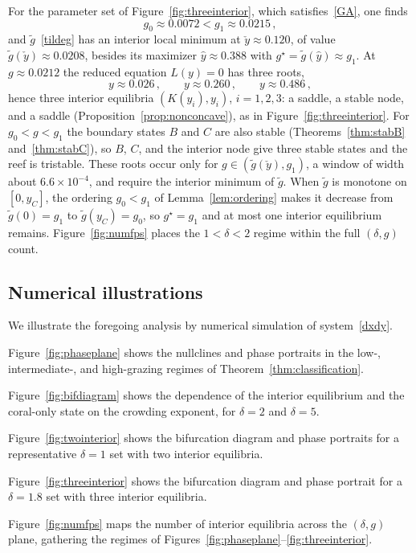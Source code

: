 \documentclass[reqno,11pt]{amsart}
\numberwithin{equation}{section}
\begin{document}
For the parameter set of Figure~\ref{fig:threeinterior}, which satisfies~\eqref{GA}, one finds
\[
g_0\approx0.0072<g_1\approx0.0215\,,
\]
and $\tilde g$~\eqref{tildeg} has an interior local minimum at $\check y\approx0.120$, of value $\tilde g(\check y)\approx0.0208$, besides its maximizer $\hat y\approx0.388$ with $g^\star=\tilde g(\hat y)\approx g_1$. At $g\approx0.0212$ the reduced equation $L(y)=0$ has three roots,
\[
y\approx0.026\,,\qquad y\approx0.260\,,\qquad y\approx0.486\,,
\]
hence three interior equilibria $(K(y_i),y_i)$, $i=1,2,3$: a saddle, a stable node, and a saddle (Proposition~\ref{prop:nonconcave}), as in Figure~\ref{fig:threeinterior}. For $g_0<g<g_1$ the boundary states $B$ and $C$ are also stable (Theorems~\ref{thm:stabB} and~\ref{thm:stabC}), so $B$, $C$, and the interior node give three stable states and the reef is tristable. These roots occur only for $g\in(\tilde g(\check y),g_1)$, a window of width about $6.6\times10^{-4}$, and require the interior minimum of $\tilde g$. When $\tilde g$ is monotone on $[0,y_C]$, the ordering $g_0<g_1$ of Lemma~\ref{lem:ordering} makes it decrease from $\tilde g(0)=g_1$ to $\tilde g(y_C)=g_0$, so $g^\star=g_1$ and at most one interior equilibrium remains. Figure~\ref{fig:numfps} places the $1<\delta<2$ regime within the full $(\delta,g)$ count.


\subsection{Numerical illustrations}
We illustrate the foregoing analysis by numerical simulation of system~\eqref{dxdy}. 

Figure~\ref{fig:phaseplane} shows the nullclines and phase portraits in the low-, intermediate-, and high-grazing regimes of Theorem~\ref{thm:classification}.

Figure~\ref{fig:bifdiagram} shows the dependence of the interior equilibrium and the coral-only state on the crowding exponent, for $\delta=2$ and $\delta=5$. 

Figure~\ref{fig:twointerior} shows the bifurcation diagram and phase portraits for a representative $\delta=1$ set with two interior equilibria.

Figure~\ref{fig:threeinterior} shows the bifurcation diagram and phase portrait for a $\delta=1.8$ set with three interior equilibria.

Figure~\ref{fig:numfps} maps the number of interior equilibria across the $(\delta,g)$ plane, gathering the regimes of Figures~\ref{fig:phaseplane}--\ref{fig:threeinterior}.
\end{document}
